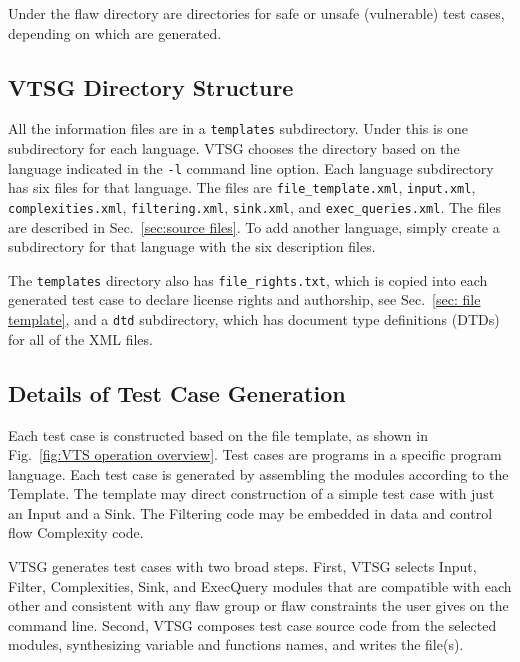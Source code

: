 \documentclass[12pt]{article}
\begin{document}
Under the flaw directory are directories for safe or unsafe
(vulnerable) test cases, depending on
which are generated.

\subsection{VTSG Directory Structure}
\label{sec: directory structure}

All the information files are in a \verb|templates| subdirectory.
Under this is one subdirectory for each language.  VTSG chooses the
directory based on the language indicated in the \verb|-l| command line
option.  Each language subdirectory has six files for that language.
The files are \verb|file_template.xml|, \verb|input.xml|, 
\verb|complexities.xml|, \verb|filtering.xml|, \verb|sink.xml|,
and \verb|exec_queries.xml|.
The files are described in Sec.~\ref{sec:source files}.
To add another language,
simply create a subdirectory for that language with the six description
files.

The \verb|templates| directory also has \verb|file_rights.txt|, which is
copied into each generated test case to declare license rights and
authorship, see Sec.~\ref{sec: file template}, and a 
\verb|dtd| subdirectory, which has document type definitions (DTDs)
for all of the XML files.


\subsection{Details of Test Case Generation}
\label{sec: generation detail}

Each test case is constructed based on the file template, as shown
in Fig.~\ref{fig:VTS operation overview}. Test cases are 
programs in a specific program language.  
Each test case is generated by
assembling the modules according to the Template.  The
template may direct construction of a simple test case with just
an Input and a Sink.
The Filtering code may be embedded in data and control flow
Complexity code.

VTSG generates test cases with two broad steps.  First, VTSG selects
Input, Filter, Complexities, Sink, and ExecQuery modules that are
compatible with each other and consistent with any flaw group or
flaw constraints the user gives on the command line.  Second, VTSG
composes test case source code from the selected modules, 
synthesizing variable and functions names, and writes the file(s).
\end{document}
